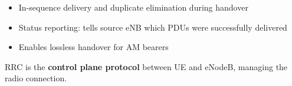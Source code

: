 \begin{enumerate}
  \begin{itemize}
  \tightlist
  \item
    In-sequence delivery and duplicate elimination during handover
  \item
    Status reporting: tells source eNB which PDUs were successfully delivered
  \item
    Enables lossless handover for AM bearers
  \end{itemize}
\end{enumerate}





RRC is the \textbf{control plane protocol} between UE and eNodeB, managing the radio connection.


